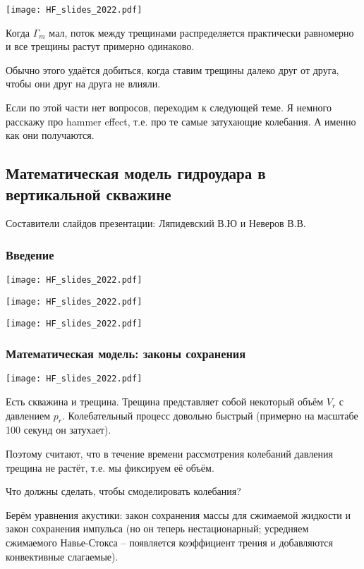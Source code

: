 \documentclass[main.tex]{subfiles}
\begin{document}
\texttt{[image: HF\_slides\_2022.pdf]}

Когда $\Gamma_m$ мал, поток между трещинами распределяется практически равномерно и все трещины растут примерно одинаково.

Обычно этого удаётся добиться, когда ставим трещины далеко друг от друга, чтобы они друг на друга не влияли.

Если по этой части нет вопросов, переходим к следующей теме.
Я немного расскажу про hammer effect, т.е. про те самые затухающие колебания.
А именно как они получаются.

\subsection{Математическая модель гидроудара в вертикальной скважине}

Составители слайдов презентации: Ляпидевский В.Ю и Неверов В.В.

\subsubsection{Введение}

\texttt{[image: HF\_slides\_2022.pdf]}

\texttt{[image: HF\_slides\_2022.pdf]}

\texttt{[image: HF\_slides\_2022.pdf]}

\subsubsection{Математическая модель: законы сохранения}

\texttt{[image: HF\_slides\_2022.pdf]}

Есть скважина и трещина.
Трещина представляет собой некоторый объём $V_r$ с давлением $p_r$.
Колебательный процесс довольно быстрый (примерно на масштабе 100 секунд он затухает).

Поэтому считают, что в течение времени рассмотрения колебаний давления трещина не растёт, т.е. мы фиксируем её объём.

Что должны сделать, чтобы смоделировать колебания?

Берём уравнения акустики: закон сохранения массы для сжимаемой жидкости и закон сохранения импульса (но он теперь нестационарный; усредняем сжимаемого Навье-Стокса -- появляется коэффициент трения и добавляются конвективные слагаемые).
\end{document}
